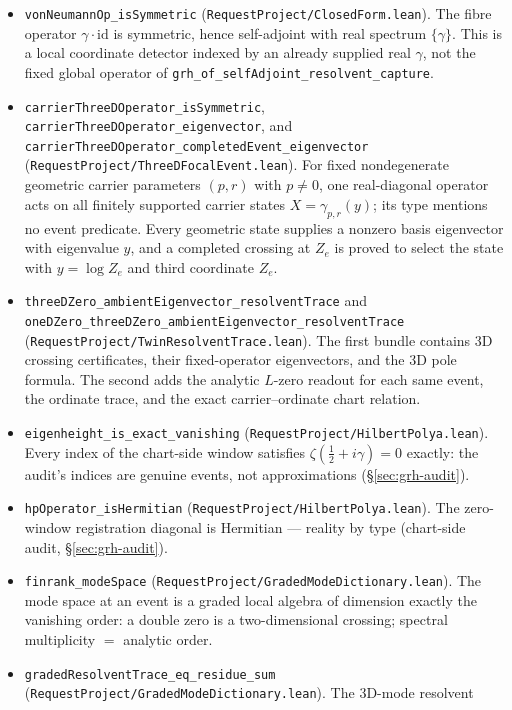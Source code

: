 \begin{itemize}
\item \texttt{vonNeumannOp\_isSymmetric}
(\texttt{RequestProject/ClosedForm.lean}). The fibre operator
\(\gamma\cdot\mathrm{id}\) is symmetric, hence self-adjoint with real
spectrum \(\{\gamma\}\).  This is a local coordinate detector indexed by an
already supplied real \(\gamma\), not the fixed global operator of
\texttt{grh\_of\_selfAdjoint\_resolvent\_capture}.
\item \texttt{carrierThreeDOperator\_isSymmetric},
\texttt{carrierThreeDOperator\_eigenvector}, and
\texttt{carrierThreeDOperator\_completedEvent\_eigenvector}
(\texttt{RequestProject/ThreeDFocalEvent.lean}).  For fixed nondegenerate geometric carrier
parameters $(p,r)$ with $p\ne0$, one real-diagonal operator acts on all finitely supported
carrier states $X=\gamma_{p,r}(y)$; its type mentions no event predicate.
Every geometric state supplies a nonzero basis eigenvector with eigenvalue
$y$, and a completed crossing at $Z_e$ is proved to select the state with
$y=\log Z_e$ and third coordinate $Z_e$.
\item \texttt{threeDZero\_ambientEigenvector\_resolventTrace} and
\texttt{oneDZero\_threeDZero\_ambientEigenvector\_resolventTrace}
(\texttt{RequestProject/TwinResolventTrace.lean}).  The first bundle contains
3D crossing certificates, their fixed-operator eigenvectors, and the 3D pole
formula.  The second adds the analytic \(L\)-zero readout for each same event,
the ordinate trace, and the exact carrier--ordinate chart relation.
\item \texttt{eigenheight\_is\_exact\_vanishing}
(\texttt{RequestProject/HilbertPolya.lean}). Every index of the chart-side
window satisfies \(\zeta(\tfrac12+i\gamma)=0\) exactly: the audit's indices
are genuine events, not approximations (\S\ref{sec:grh-audit}).
\item \texttt{hpOperator\_isHermitian}
(\texttt{RequestProject/HilbertPolya.lean}). The zero-window registration
diagonal is Hermitian --- reality by type (chart-side audit,
\S\ref{sec:grh-audit}).
\item \texttt{finrank\_modeSpace}
(\texttt{RequestProject/GradedModeDictionary.lean}). The mode space at an
event is a graded local algebra of dimension exactly the vanishing order: a
double zero is a two-dimensional crossing; spectral multiplicity \(=\)
analytic order.
\item \texttt{gradedResolventTrace\_eq\_residue\_sum}
(\texttt{RequestProject/GradedModeDictionary.lean}). The 3D-mode resolvent

\end{itemize}
